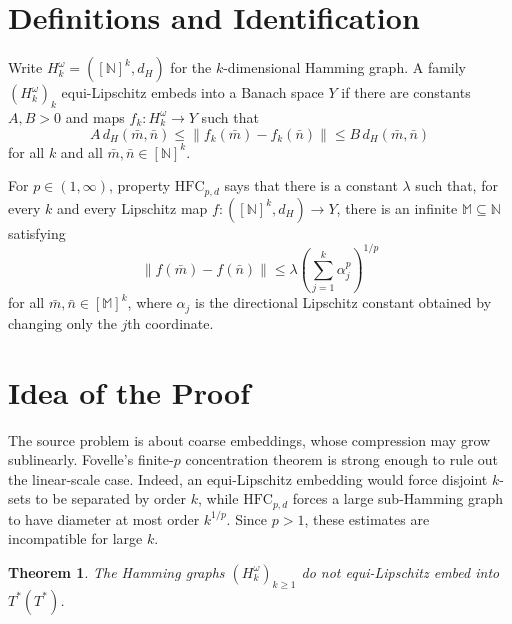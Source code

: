 \documentclass[11pt]{article}
\newtheorem{theorem}{Theorem}
\newcommand{\N}{\mathbb{N}}
\newcommand{\HFC}{\mathrm{HFC}}
\begin{document}
\section*{Definitions and Identification}

Write $H_k^\omega=([\N]^k,d_H)$ for the $k$-dimensional Hamming graph. A
family $(H_k^\omega)_k$ equi-Lipschitz embeds into a Banach space $Y$ if
there are constants $A,B>0$ and maps $f_k:H_k^\omega\to Y$ such that
\[
  A\,d_H(\bar m,\bar n)\le \|f_k(\bar m)-f_k(\bar n)\|
  \le B\,d_H(\bar m,\bar n)
\]
for all $k$ and all $\bar m,\bar n\in[\N]^k$.

For $p\in(1,\infty)$, property $\HFC_{p,d}$ says that there is a constant
$\lambda$ such that, for every $k$ and every Lipschitz map
$f:([\N]^k,d_H)\to Y$, there is an infinite $\mathbb M\subseteq\N$ satisfying
\[
  \|f(\bar m)-f(\bar n)\|
  \le \lambda \left(\sum_{j=1}^k \alpha_j^p\right)^{1/p}
\]
for all $\bar m,\bar n\in[\mathbb M]^k$, where $\alpha_j$ is the directional
Lipschitz constant obtained by changing only the $j$th coordinate.

\section*{Idea of the Proof}

The source problem is about coarse embeddings, whose compression may grow
sublinearly. Fovelle's finite-$p$ concentration theorem is strong enough to
rule out the linear-scale case. Indeed, an equi-Lipschitz embedding would
force disjoint $k$-sets to be separated by order $k$, while $\HFC_{p,d}$
forces a large sub-Hamming graph to have diameter at most order $k^{1/p}$.
Since $p>1$, these estimates are incompatible for large $k$.

\begin{theorem}
The Hamming graphs $(H_k^\omega)_{k\ge 1}$ do not equi-Lipschitz embed into
$T^*(T^*)$.
\end{theorem}
\end{document}
